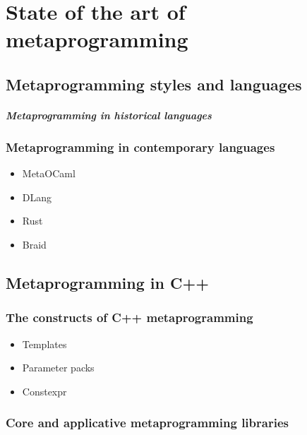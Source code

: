 \documentclass[../../main.tex]{subfiles}
\begin{document}

\chapter{State of the art of metaprogramming}

\section{Metaprogramming styles and languages}

\paragraph{Metaprogramming in historical languages}

\subsection{Metaprogramming in contemporary languages}

\begin{itemize}
\item MetaOCaml

\item DLang

\item Rust

\item Braid
\end{itemize}

\section{Metaprogramming in C++}

\subsection{The constructs of C++ metaprogramming}

\begin{itemize}
\item Templates

\item Parameter packs

\item Constexpr
\end{itemize}

\subsection{Core and applicative metaprogramming libraries}
\end{document}
